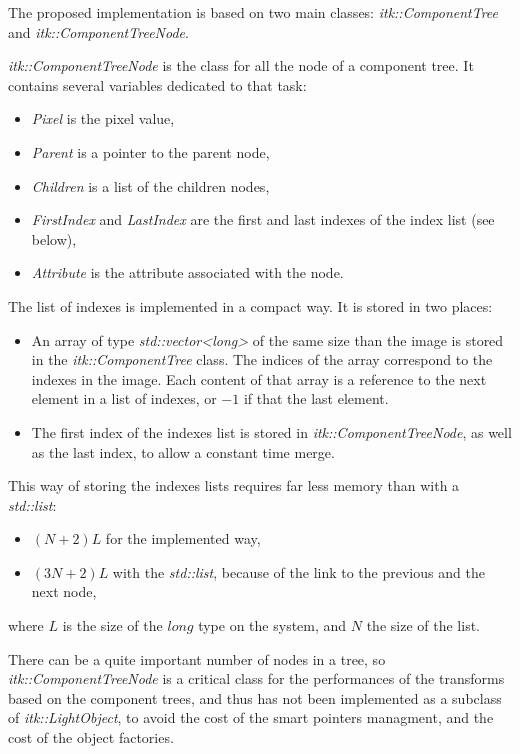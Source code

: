 \documentclass{InsightArticle}
\begin{document}
The proposed implementation is based on two main classes: {\em itk::ComponentTree} and {\em itk::ComponentTreeNode}.

{\em itk::ComponentTreeNode} is the class for all the node of a component tree. It contains several variables dedicated to that task:
\begin{itemize}
  \item {\em Pixel} is the pixel value,
  \item {\em Parent} is a pointer to the parent node,
  \item {\em Children} is a list of the children nodes,
  \item {\em FirstIndex} and {\em LastIndex} are the first and last indexes of the index list (see below),
  \item {\em Attribute} is the attribute associated with the node.
\end{itemize}

The list of indexes is implemented in a compact way. It is stored in two places:
\begin{itemize}
  \item An array of type {\em std::vector<long>} of the same size than the image is stored in the {\em itk::ComponentTree} class. The indices of the array correspond to the indexes in the image. Each content of that array is a reference to the next element in a list of indexes, or $-1$ if that the last element.
  \item The first index of the indexes list is stored in {\em itk::ComponentTreeNode}, as well as the last index, to allow a constant time merge.
\end{itemize}
This way of storing the indexes lists requires far less memory than with a {\em std::list}:
\begin{itemize}
  \item $(N+2)L$ for the implemented way,
  \item $(3N+2)L$ with the {\em std::list}, because of the link to the previous and the next node,
\end{itemize}
where $L$ is the size of the $long$ type on the system, and $N$ the size of the list.

There can be a quite important number of nodes in a tree, so {\em itk::ComponentTreeNode} is a critical class for the performances of the transforms based on the component trees, and thus has not been implemented as a subclass of {\em itk::LightObject}, to avoid the cost of the smart pointers managment, and the cost of the object factories.
\end{document}
